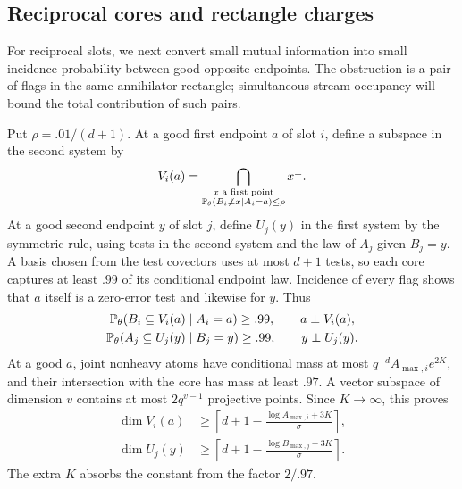 \subsection{Reciprocal cores and rectangle charges}

For reciprocal slots, we next convert small mutual information into
small incidence probability between good opposite endpoints. The
obstruction is a pair of flags in the same annihilator rectangle;
simultaneous stream occupancy will bound the total contribution of
such pairs.

Put $\rho=.01/(d+1)$. At a good first endpoint $a$ of slot $i$, define
a subspace in the second system by
\begin{equation}\label{mark:cores}
 V_i(a)=\bigcap_{\substack{x\text{ a first point}\\
       \mathbb P_\theta(B_i\not\perp x\mid A_i=a)\le\rho}}x^\perp.
\end{equation}
At a good second endpoint $y$ of slot $j$, define $U_j(y)$ in the first
system by the symmetric rule, using tests in the second system and the
law of $A_j$ given $B_j=y$. A basis chosen from the test covectors
uses at most $d+1$ tests, so each core captures at least $.99$ of its
conditional endpoint law. Incidence of every flag shows that $a$
itself is a zero-error test and likewise for $y$. Thus
\begin{equation}\label{mark:core-capture}
 \begin{gathered}
 \mathbb P_\theta(B_i\subseteq V_i(a)\mid A_i=a)\ge .99,
 \qquad a\perp V_i(a),\\
 \mathbb P_\theta(A_j\subseteq U_j(y)\mid B_j=y)\ge .99,
 \qquad y\perp U_j(y).
 \end{gathered}
\end{equation}
At a good $a$, joint nonheavy atoms have conditional mass at most
$q^{-d}A_{\max,i}e^{2K}$, and their intersection with the core has
mass at least $.97$. A vector subspace of dimension $v$ contains at
most $2q^{v-1}$ projective points. Since $K\to\infty$, this proves
\begin{equation}\label{mark:core-dimension}
 \begin{aligned}
 \dim V_i(a)&\ge
 \left\lceil d+1-\frac{\log A_{\max,i}+3K}{\sigma}\right\rceil,\\
 \dim U_j(y)&\ge
 \left\lceil d+1-\frac{\log B_{\max,j}+3K}{\sigma}\right\rceil.
 \end{aligned}
\end{equation}
The extra $K$ absorbs the constant from the factor $2/.97$.

